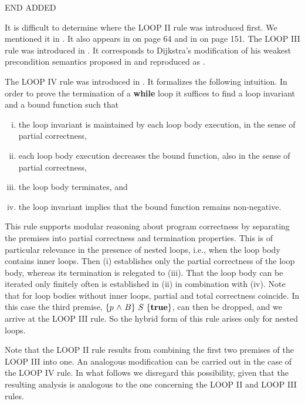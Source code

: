 \documentclass[runningheads]{llncs}       %
\begin{document}
END ADDED

\III


It is difficult to determine where the LOOP II
rule was introduced first. We mentioned it in \cite{ABO90}. It also
appears in \cite{Rey98} on page 64 and in \cite{Almeida11} on page 151. 
The LOOP III rule was introduced in \cite{OG76a}. It corresponds to
Dijkstra's modification of his weakest precondition semantics proposed
in \cite{EWD:EWD573} and reproduced as %
\cite{EWD:EWD573pub}.  

The LOOP IV rule was introduced in \cite{ABO25}.
It formalizes the following intuition. In order to prove the
termination of a \textbf{while} loop it suffices to find a loop
invariant and a bound function such that

\begin{enumerate}[(i)]
 \item the loop invariant is maintained by each loop body execution, 
       in the sense of partial correctness,
 \item each loop body execution decreases the bound function, 
       also in the sense of partial correctness,
 \item the loop body terminates, and
 \item the loop invariant implies that the bound function remains non-negative.
\end{enumerate}

This rule supports modular reasoning about program correctness
by separating the premises into partial correctness and termination
properties.  This is of particular relevance in the presence of nested
loops, i.e., when the loop body contains inner loops.  Then (i)
establishes only the partial correctness of the loop body, whereas its
termination is relegated to (iii). That the loop body can be iterated
only finitely often is established in (ii) in combination with (iv).
Note that for loop bodies without inner loops, partial and total
correctness coincide. In this case the third premise,
$\mbox{$\{{p \mbox{$\ \wedge\ $} B}\}\ {S}\ \{{\mathbf{true}}\}$}$, can then be dropped, and we arrive at
the LOOP III rule. So the hybrid form of this rule arises only for
nested loops.

Note that the LOOP II rule results from combining the first two
premises of the LOOP III into one.  An analogous modification can be
carried out in the case of the LOOP IV rule. In what follows we
disregard this possibility, given that the resulting analysis is
analogous to the one concerning the LOOP II and LOOP III rules.
\end{document}
